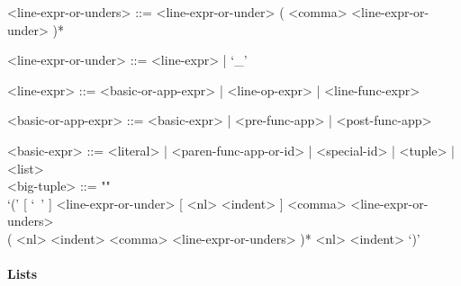 \documentclass{article}
\begin{document}
\begin{itemize}
\begin{grammar}
<line-expr-or-unders> ::=
<line-expr-or-under> ( <comma> <line-expr-or-under> )*

<line-expr-or-under> ::= <line-expr> | `_'

<line-expr> ::= <basic-or-app-expr> | <line-op-expr> | <line-func-expr>

<basic-or-app-expr> ::= <basic-expr> | <pre-func-app> | <post-func-app>

<basic-expr> ::=
<literal> | <paren-func-app-or-id> | <special-id> | <tuple> | <list>
\\

<big-tuple> ::= ""\\
`(' [ `\ ' ] <line-expr-or-under> [ <nl> <indent> ]
<comma> <line-expr-or-unders> \\
( <nl> <indent> <comma> <line-expr-or-unders> )*
<nl> <indent> `)'
\end{grammar}

\end{itemize}

\paragraph{Lists}
\end{document}
